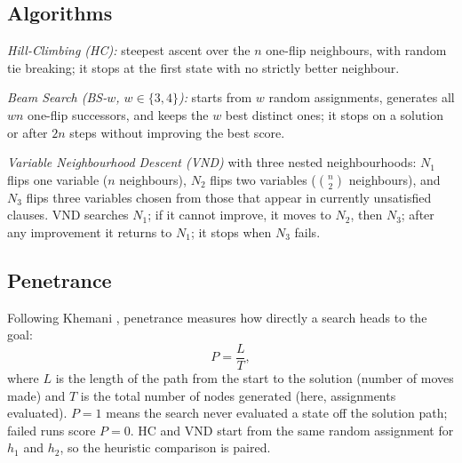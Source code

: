 \documentclass[journal]{IEEEtran}
\begin{document}
\subsection{Algorithms}
\emph{Hill-Climbing (HC):} steepest ascent over the $n$ one-flip neighbours, with random tie
breaking; it stops at the first state with no strictly better neighbour.

\emph{Beam Search (BS-$w$, $w\in\{3,4\}$):} starts from $w$ random assignments, generates all
$wn$ one-flip successors, and keeps the $w$ best distinct ones; it stops on a solution or after
$2n$ steps without improving the best score.

\emph{Variable Neighbourhood Descent (VND)} \cite{hansen2001} with three nested neighbourhoods:
$N_1$ flips one variable ($n$ neighbours), $N_2$ flips two variables ($\binom{n}{2}$
neighbours), and $N_3$ flips three variables chosen from those that appear in currently
unsatisfied clauses. VND searches $N_1$; if it cannot improve, it moves to $N_2$, then $N_3$;
after any improvement it returns to $N_1$; it stops when $N_3$ fails.

\subsection{Penetrance}
Following Khemani \cite{khemani}, penetrance measures how directly a search heads to the goal:
\begin{equation}
P = \frac{L}{T},
\end{equation}
where $L$ is the length of the path from the start to the solution (number of moves made) and
$T$ is the total number of nodes generated (here, assignments evaluated). $P=1$ means the search
never evaluated a state off the solution path; failed runs score $P=0$. HC and VND start from
the same random assignment for $h_1$ and $h_2$, so the heuristic comparison is paired.
\end{document}
